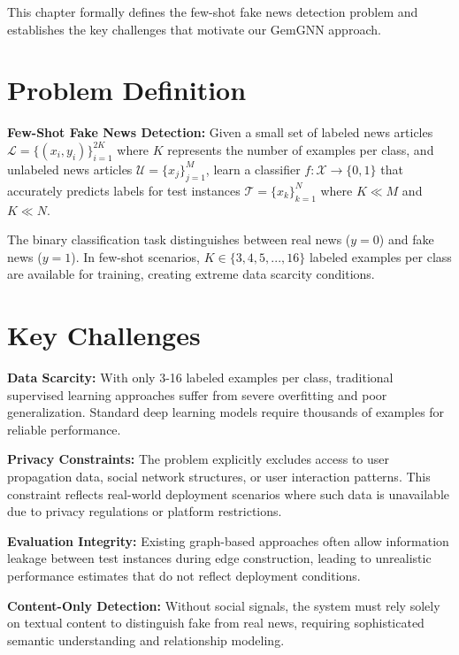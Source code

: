 
This chapter formally defines the few-shot fake news detection problem and establishes the key challenges that motivate our GemGNN approach.

\section{Problem Definition}

\textbf{Few-Shot Fake News Detection:} Given a small set of labeled news articles $\mathcal{L} = \{(x_i, y_i)\}_{i=1}^{2K}$ where $K$ represents the number of examples per class, and unlabeled news articles $\mathcal{U} = \{x_j\}_{j=1}^{M}$, learn a classifier $f: \mathcal{X} \rightarrow \{0,1\}$ that accurately predicts labels for test instances $\mathcal{T} = \{x_k\}_{k=1}^{N}$ where $K \ll M$ and $K \ll N$.

The binary classification task distinguishes between real news ($y = 0$) and fake news ($y = 1$). In few-shot scenarios, $K \in \{3, 4, 5, ..., 16\}$ labeled examples per class are available for training, creating extreme data scarcity conditions.

\section{Key Challenges}

\textbf{Data Scarcity:} With only 3-16 labeled examples per class, traditional supervised learning approaches suffer from severe overfitting and poor generalization. Standard deep learning models require thousands of examples for reliable performance.

\textbf{Privacy Constraints:} The problem explicitly excludes access to user propagation data, social network structures, or user interaction patterns. This constraint reflects real-world deployment scenarios where such data is unavailable due to privacy regulations or platform restrictions.

\textbf{Evaluation Integrity:} Existing graph-based approaches often allow information leakage between test instances during edge construction, leading to unrealistic performance estimates that do not reflect deployment conditions.

\textbf{Content-Only Detection:} Without social signals, the system must rely solely on textual content to distinguish fake from real news, requiring sophisticated semantic understanding and relationship modeling.

